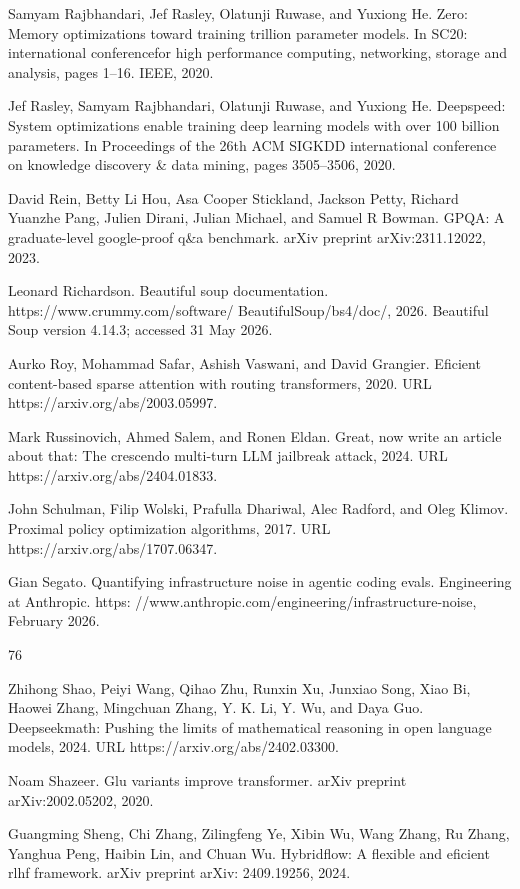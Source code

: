 \documentclass[
  10
]{article}
\begin{document}
Samyam Rajbhandari, Jef Rasley, Olatunji Ruwase, and Yuxiong He. Zero:
Memory optimizations toward training trillion parameter models. In SC20:
international conferencefor high performance computing, networking,
storage and analysis, pages 1--16. IEEE, 2020.

Jef Rasley, Samyam Rajbhandari, Olatunji Ruwase, and Yuxiong He.
Deepspeed: System optimizations enable training deep learning models
with over 100 billion parameters. In Proceedings of the 26th ACM SIGKDD
international conference on knowledge discovery \& data mining, pages
3505--3506, 2020.

David Rein, Betty Li Hou, Asa Cooper Stickland, Jackson Petty, Richard
Yuanzhe Pang, Julien Dirani, Julian Michael, and Samuel R Bowman. GPQA:
A graduate-level google-proof q\&a benchmark. arXiv preprint
arXiv:2311.12022, 2023.

Leonard Richardson. Beautiful soup documentation.
https://www.crummy.com/software/ BeautifulSoup/bs4/doc/, 2026. Beautiful
Soup version 4.14.3; accessed 31 May 2026.

Aurko Roy, Mohammad Safar, Ashish Vaswani, and David Grangier. Eficient
content-based sparse attention with routing transformers, 2020. URL
https://arxiv.org/abs/2003.05997.

Mark Russinovich, Ahmed Salem, and Ronen Eldan. Great, now write an
article about that: The crescendo multi-turn LLM jailbreak attack, 2024.
URL https://arxiv.org/abs/2404.01833.

John Schulman, Filip Wolski, Prafulla Dhariwal, Alec Radford, and Oleg
Klimov. Proximal policy optimization algorithms, 2017. URL
https://arxiv.org/abs/1707.06347.

Gian Segato. Quantifying infrastructure noise in agentic coding evals.
Engineering at Anthropic. https:
//www.anthropic.com/engineering/infrastructure-noise, February 2026.

76

Zhihong Shao, Peiyi Wang, Qihao Zhu, Runxin Xu, Junxiao Song, Xiao Bi,
Haowei Zhang, Mingchuan Zhang, Y. K. Li, Y. Wu, and Daya Guo.
Deepseekmath: Pushing the limits of mathematical reasoning in open
language models, 2024. URL https://arxiv.org/abs/2402.03300.

Noam Shazeer. Glu variants improve transformer. arXiv preprint
arXiv:2002.05202, 2020.

Guangming Sheng, Chi Zhang, Zilingfeng Ye, Xibin Wu, Wang Zhang, Ru
Zhang, Yanghua Peng, Haibin Lin, and Chuan Wu. Hybridflow: A flexible
and eficient rlhf framework. arXiv preprint arXiv: 2409.19256, 2024.
\end{document}
